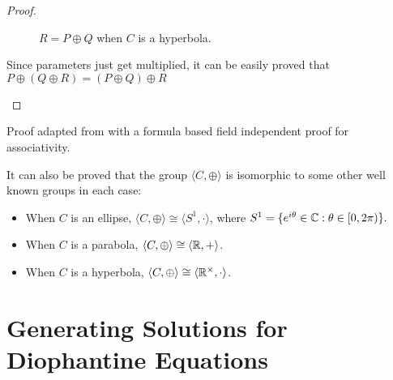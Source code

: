 \begin{proof}
\begin{itemize}
{        \begin{figure}[H]
          \center
          \caption{$R = P \oplus Q$ when $C$ is a hyperbola.}
        \end{figure}

        Since parameters just get multiplied, it can be easily proved that\\
        $P\oplus(Q\oplus R)=(P\oplus Q)\oplus R$
      }
  \end{itemize}
\end{proof}

Proof adapted from \cite{shirali} with a formula based field independent proof for
associativity.

\begin{remark}
  It can also be proved that the group $\langle C,\oplus\rangle$ is isomorphic to some other
  well known groups in each case:

  \begin{itemize}
  \item{
      When $C$ is an ellipse, $\langle C,\oplus\rangle\cong\langle S^1,\cdot\rangle$, where
      $S^1=\{e^{i\theta}\in\mathbb{C}:\theta\in[0,2\pi)\}.$
    }
  \item{
      When $C$ is a parabola, $\langle C,\oplus\rangle\cong\langle\mathbb{R},+\rangle$.
    }
  \item{
      When $C$ is a hyperbola, $\langle C,\oplus\rangle\cong\langle\mathbb{R}^{\times},\cdot\rangle$.
    }
  \end{itemize}
\end{remark}

\section{Generating Solutions for Diophantine Equations}

